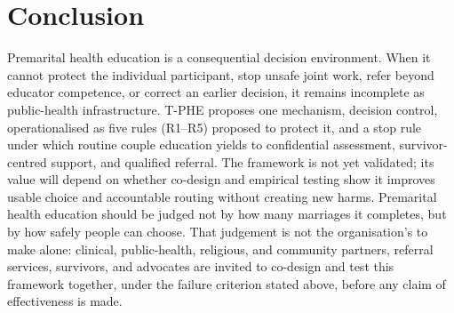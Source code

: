 \documentclass[11pt]{article}
\newcommand{\tphe}{T\mbox{-}PHE}
\begin{document}
\section{Conclusion}
Premarital health education is a consequential decision environment. When it cannot protect the individual participant, stop unsafe joint work, refer beyond educator competence, or correct an earlier decision, it remains incomplete as public-health infrastructure. \tphe{} proposes one mechanism, decision control, operationalised as five rules (R1--R5) proposed to protect it, and a stop rule under which routine couple education yields to confidential assessment, survivor-centred support, and qualified referral. The framework is not yet validated; its value will depend on whether co-design and empirical testing show it improves usable choice and accountable routing without creating new harms. Premarital health education should be judged not by how many marriages it completes, but by how safely people can choose. That judgement is not the organisation's to make alone: clinical, public-health, religious, and community partners, referral services, survivors, and advocates are invited to co-design and test this framework together, under the failure criterion stated above, before any claim of effectiveness is made.

\FloatBarrier
\end{document}
